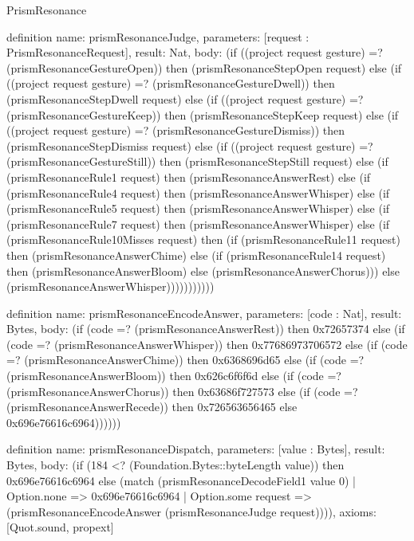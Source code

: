 \begin{lexlean}{PrismResonance}
\begin{semanticmodule}
definition{
  name: prismResonanceJudge,
  parameters: [request : PrismResonanceRequest],
  result: Nat,
  body: (if ((project request gesture) =? (prismResonanceGestureOpen)) then (prismResonanceStepOpen request) else (if ((project request gesture) =? (prismResonanceGestureDwell)) then (prismResonanceStepDwell request) else (if ((project request gesture) =? (prismResonanceGestureKeep)) then (prismResonanceStepKeep request) else (if ((project request gesture) =? (prismResonanceGestureDismiss)) then (prismResonanceStepDismiss request) else (if ((project request gesture) =? (prismResonanceGestureStill)) then (prismResonanceStepStill request) else (if (prismResonanceRule1 request) then (prismResonanceAnswerRest) else (if (prismResonanceRule4 request) then (prismResonanceAnswerWhisper) else (if (prismResonanceRule5 request) then (prismResonanceAnswerWhisper) else (if (prismResonanceRule7 request) then (prismResonanceAnswerWhisper) else (if (prismResonanceRule10Misses request) then (if (prismResonanceRule11 request) then (prismResonanceAnswerChime) else (if (prismResonanceRule14 request) then (prismResonanceAnswerBloom) else (prismResonanceAnswerChorus))) else (prismResonanceAnswerWhisper)))))))))))
}

definition{
  name: prismResonanceEncodeAnswer,
  parameters: [code : Nat],
  result: Bytes,
  body: (if (code =? (prismResonanceAnswerRest)) then 0x72657374 else (if (code =? (prismResonanceAnswerWhisper)) then 0x77686973706572 else (if (code =? (prismResonanceAnswerChime)) then 0x6368696d65 else (if (code =? (prismResonanceAnswerBloom)) then 0x626c6f6f6d else (if (code =? (prismResonanceAnswerChorus)) then 0x63686f727573 else (if (code =? (prismResonanceAnswerRecede)) then 0x726563656465 else 0x696e76616c6964))))))
}

definition{
  name: prismResonanceDispatch,
  parameters: [value : Bytes],
  result: Bytes,
  body: (if (184 <? (Foundation.Bytes::byteLength value)) then 0x696e76616c6964 else (match (prismResonanceDecodeField1 value 0)
    | Option.none => 0x696e76616c6964
    | Option.some request => (prismResonanceEncodeAnswer (prismResonanceJudge request)))),
  axioms: [Quot.sound, propext]
}
\end{semanticmodule}
\end{lexlean}
